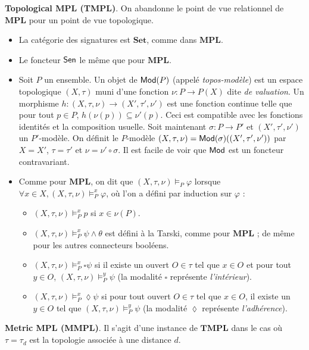 \documentclass[11pt,a4paper]{article}
\newcommand{\ph}{\varphi}
\newcommand{\itemz}{\item[$\triangleright$]}
\newcommand{\gr}{\textbf}
\newcommand{\il}{\textit}
\newcommand{\info}[1]{\text{{\fontfamily{lmss}\selectfont #1}}}
\newcommand{\Mod}{\info{Mod}}
\newcommand{\Sen}{\info{Sen}}
\begin{document}
\gr{Topological MPL (TMPL)}. On abandonne le point de vue relationnel de $\gr{MPL}$ pour un point de vue topologique.
\begin{itemize}
\itemz La catégorie des signatures est $\gr{Set}$, comme dans $\gr{MPL}$.
\itemz Le foncteur $\Sen$ le même que pour $\gr{MPL}$.
\itemz Soit $P$ un ensemble. Un objet de $\Mod(P)$ (appelé \il{topos-modèle}) est un espace topologique $(X,\tau)$ muni d'une fonction $\nu : P \to P(X)$ dite \il{de valuation}. Un morphisme $h : (X,\tau,\nu) \to (X',\tau',\nu')$ est une fonction continue telle que pour tout $p \in P$, $h(\nu(p)) \subseteq \nu'(p)$. Ceci est compatible avec les fonctions identités et la composition usuelle. Soit maintenant $\sigma : P \to P'$ et $(X',\tau',\nu')$ un $P'$-modèle. On définit le $P$-modèle $(X,\tau,\nu) = \Mod(\sigma)((X',\tau',\nu'))$ par $X = X'$, $\tau = \tau'$ et $\nu = \nu' \circ \sigma$. Il est facile de voir que $\Mod$ est un foncteur contravariant.
\itemz Comme pour $\gr{MPL}$, on dit que $(X,\tau,\nu) \models_P \ph$ lorsque $\forall x \in X, (X,\tau,\nu) \models_P^x \ph$, où l'on a défini par induction sur $\ph$ :
\begin{itemize}
\setlength\itemsep{-0.3em}
\item $(X,\tau,\nu) \models_P^x p$ si $x \in \nu(P)$.
\item $(X,\tau,\nu) \models_P^x \psi \wedge \theta$ est défini à la Tarski, comme pour $\gr{MPL}$ ; de même pour les autres connecteurs booléens.
\item $(X,\tau,\nu) \models_P^x \square \psi$ si il existe un ouvert $O \in \tau$ tel que $x \in O$ et pour tout $y \in O$, $(X,\tau,\nu) \models_P^y \psi$ (la modalité $\square$ représente \il{l'intérieur}).
\item $(X,\tau,\nu) \models_P^x \lozenge \psi$ si pour tout ouvert $O \in \tau$ tel que $x \in O$, il existe un $y \in O$ tel que $(X,\tau,\nu) \models_P^y \psi$ (la modalité $\lozenge$ représente \il{l'adhérence}).
\end{itemize}
\end{itemize}
\gr{Metric MPL (MMPL)}. Il s'agit d'une instance de $\gr{TMPL}$ dans le cas où $\tau = \tau_d$ est la topologie associée à une distance $d$.
\end{document}
